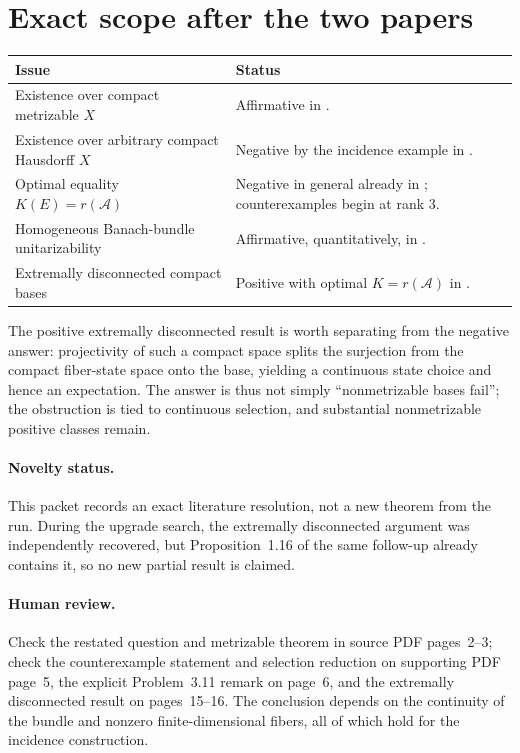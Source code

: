 \documentclass[11pt]{article}
\newcommand{\A}{\mathcal A}
\begin{document}
\section*{Exact scope after the two papers}
\begin{center}
\small
\begin{tabularx}{\textwidth}{@{}p{}X@{}}
\toprule
Issue & Status \\
\midrule
Existence over compact metrizable $X$ & Affirmative in \cite[Theorem~2.12]{source}. \\
Existence over arbitrary compact Hausdorff $X$ & Negative by the incidence example in \cite[Theorem~1.3]{answer}. \\
Optimal equality $K(E)=r(\A)$ & Negative in general already in \cite{source}; counterexamples begin at rank $3$. \\
Homogeneous Banach-bundle unitarizability & Affirmative, quantitatively, in \cite{source}. \\
Extremally disconnected compact bases & Positive with optimal $K=r(\A)$ in \cite[Proposition~1.16]{answer}. \\
\bottomrule
\end{tabularx}
\end{center}

The positive extremally disconnected result is worth separating from the
negative answer: projectivity of such a compact space splits the surjection
from the compact fiber-state space onto the base, yielding a continuous state
choice and hence an expectation.  The answer is thus not simply
``nonmetrizable bases fail''; the obstruction is tied to continuous
selection, and substantial nonmetrizable positive classes remain.

\paragraph{Novelty status.}
This packet records an exact literature resolution, not a new theorem from
the run.  During the upgrade search, the extremally disconnected argument was
independently recovered, but Proposition~1.16 of the same follow-up already
contains it, so no new partial result is claimed.

\paragraph{Human review.}
Check the restated question and metrizable theorem in source PDF pages~2--3;
check the counterexample statement and selection reduction on supporting PDF
page~5, the explicit Problem~3.11 remark on page~6, and the extremally
disconnected result on pages~15--16.  The conclusion depends on the
continuity of the bundle and nonzero finite-dimensional fibers, all of which
hold for the incidence construction.
\end{document}
